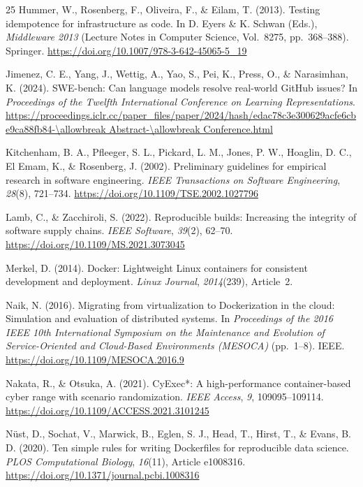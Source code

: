 \documentclass[3p,twocolumn,authoryear]{elsarticle}
\begin{document}
\begin{thebibliography}{25}
Hummer, W., Rosenberg, F., Oliveira, F., \& Eilam, T. (2013). Testing
idempotence for infrastructure as code. In D. Eyers \& K. Schwan
(Eds.), \textit{Middleware 2013} (Lecture Notes in Computer Science,
Vol.~8275, pp.~368--388). Springer.
\url{https://doi.org/10.1007/978-3-642-45065-5\_19}

Jimenez, C. E., Yang, J., Wettig, A., Yao, S., Pei, K., Press, O., \&
Narasimhan, K. (2024). SWE-bench: Can language models resolve real-world
GitHub issues? In \textit{Proceedings of the Twelfth International
Conference on Learning Representations}.
\url{https://proceedings.iclr.cc/paper\_files/paper/2024/hash/edac78c3e300629acfe6cbe9ca88fb84-\allowbreak Abstract-\allowbreak Conference.html}

Kitchenham, B. A., Pfleeger, S. L., Pickard, L. M., Jones, P. W.,
Hoaglin, D. C., El Emam, K., \& Rosenberg, J. (2002). Preliminary
guidelines for empirical research in software engineering.
\textit{IEEE Transactions on Software Engineering}, \textit{28}(8),
721--734. \url{https://doi.org/10.1109/TSE.2002.1027796}

Lamb, C., \& Zacchiroli, S. (2022). Reproducible builds: Increasing the
integrity of software supply chains. \textit{IEEE Software},
\textit{39}(2), 62--70. \url{https://doi.org/10.1109/MS.2021.3073045}

Merkel, D. (2014). Docker: Lightweight Linux containers for consistent
development and deployment. \textit{Linux Journal}, \textit{2014}(239),
Article~2.

Naik, N. (2016). Migrating from virtualization to Dockerization in the
cloud: Simulation and evaluation of distributed systems. In
\textit{Proceedings of the 2016 IEEE 10th International Symposium on
the Maintenance and Evolution of Service-Oriented and Cloud-Based
Environments (MESOCA)} (pp.~1--8). IEEE.
\url{https://doi.org/10.1109/MESOCA.2016.9}

Nakata, R., \& Otsuka, A. (2021). CyExec*: A high-performance
container-based cyber range with scenario randomization.
\textit{IEEE Access}, \textit{9}, 109095--109114.
\url{https://doi.org/10.1109/ACCESS.2021.3101245}

N\"ust, D., Sochat, V., Marwick, B., Eglen, S. J., Head, T., Hirst, T.,
\& Evans, B. D. (2020). Ten simple rules for writing Dockerfiles for
reproducible data science. \textit{PLOS Computational Biology},
\textit{16}(11), Article e1008316.
\url{https://doi.org/10.1371/journal.pcbi.1008316}


\end{thebibliography}
\end{document}
